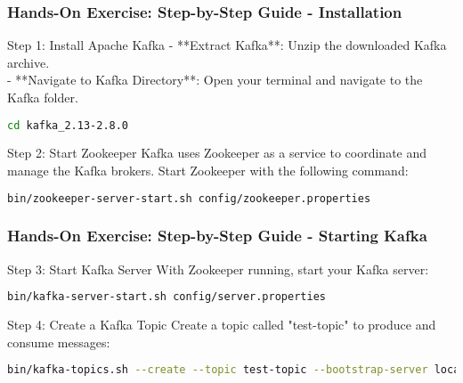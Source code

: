 \documentclass[aspectratio=169]{beamer}
\begin{document}
\begin{frame}[fragile]
    \frametitle{Hands-On Exercise: Step-by-Step Guide - Installation}
    \begin{block}{Step 1: Install Apache Kafka}
        - **Extract Kafka**: Unzip the downloaded Kafka archive. \\
        - **Navigate to Kafka Directory**: Open your terminal and navigate to the Kafka folder.

        \begin{lstlisting}[language=bash]
cd kafka_2.13-2.8.0
        \end{lstlisting}
    \end{block}

    \begin{block}{Step 2: Start Zookeeper}
        Kafka uses Zookeeper as a service to coordinate and manage the Kafka brokers. Start Zookeeper with the following command:

        \begin{lstlisting}[language=bash]
bin/zookeeper-server-start.sh config/zookeeper.properties
        \end{lstlisting}
    \end{block}
\end{frame}

\begin{frame}[fragile]
    \frametitle{Hands-On Exercise: Step-by-Step Guide - Starting Kafka}
    \begin{block}{Step 3: Start Kafka Server}
        With Zookeeper running, start your Kafka server:

        \begin{lstlisting}[language=bash]
bin/kafka-server-start.sh config/server.properties
        \end{lstlisting}
    \end{block}

    \begin{block}{Step 4: Create a Kafka Topic}
        Create a topic called "test-topic" to produce and consume messages:

        \begin{lstlisting}[language=bash]
bin/kafka-topics.sh --create --topic test-topic --bootstrap-server localhost:9092 --replication-factor 1 --partitions 1
        \end{lstlisting}
    \end{block}
\end{frame}
\end{document}
